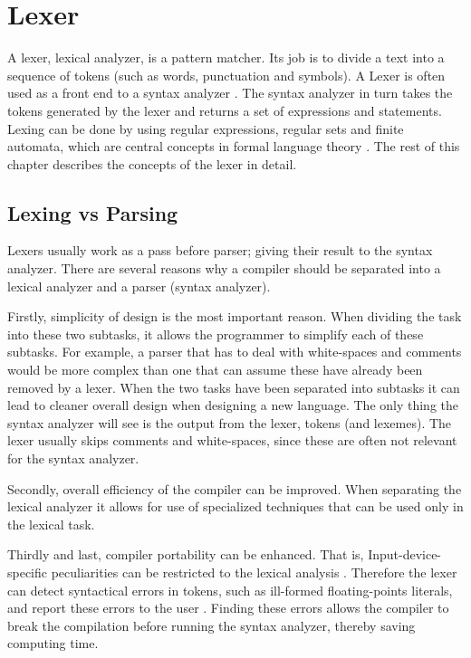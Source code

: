 \chapter{Lexer \label{chap:lexer}}
A lexer, lexical analyzer, is a pattern matcher. Its job is to divide a text
into a sequence of tokens (such as words, punctuation and symbols). A Lexer is
often used as a front end to a syntax analyzer \cite{sebesta2012}. The syntax
analyzer in turn takes the tokens generated by the lexer and returns a set of
expressions and statements. Lexing can be done by using regular expressions,
regular sets and finite automata, which are central concepts in formal language
theory \cite{Aho1990}. The rest of this chapter describes the concepts of the
lexer in detail.

\section{Lexing vs Parsing}
Lexers usually work as a pass before parser; giving their result to the syntax
analyzer. There are several reasons why a compiler should be separated into a
lexical analyzer and a parser (syntax analyzer).

Firstly, simplicity of design is the most important reason. When dividing the task
into these two subtasks, it allows the programmer to simplify each of these
subtasks. For example, a parser that has to deal with white-spaces and comments
would be more complex than one that can assume these have already been removed
by a lexer. When the two tasks have been separated into subtasks it can lead to 
cleaner overall design when designing a new language. The only thing the syntax
analyzer will see is the output from the lexer, tokens (and lexemes). The lexer
usually skips comments and white-spaces, since these are often not relevant for
the syntax analyzer.

Secondly, overall efficiency of the compiler can be improved. When separating the 
lexical analyzer it allows for use of specialized techniques that can be used 
only in the lexical task.

Thirdly and last, compiler portability can be enhanced. That is,
Input-device-specific peculiarities can be restricted to the lexical analysis
\cite{Aho2006}. Therefore the lexer can detect syntactical errors in tokens,
such as ill-formed floating-points literals, and report these errors to the user
\cite{sebesta2012}. Finding these errors allows the compiler to break the
compilation before running the syntax analyzer, thereby saving computing time.

